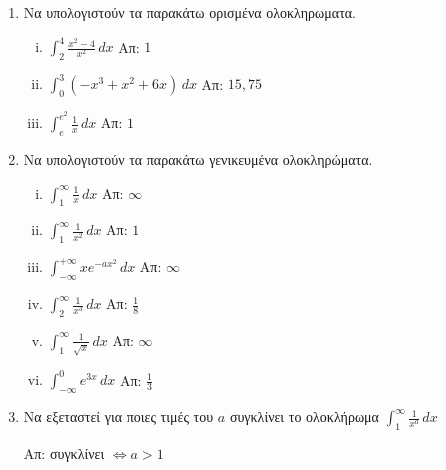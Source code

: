 \begin{enumerate}
    \item Να υπολογιστούν τα παρακάτω ορισμένα ολοκληρωματα.
        \begin{enumerate}[i)]
            \item $ \int _{2}^{4} \frac{x^{2}-4}{x^{2}} \,{dx} $ \hfill Απ: $ 1 $
            \item $ \int _{0}^{3} \left(-x^{3}+x^{2}+6x\right) \,{dx} $ 
                \hfill Απ: $ 15,75 $ 
            \item $ \int _{e}^{e^{2}} \frac{1}{x}  \,{dx} $ \hfill Απ: $ 1 $ 
        \end{enumerate}

\pagebreak

    \item Να υπολογιστούν τα παρακάτω γενικευμένα ολοκληρώματα.

        \begin{enumerate}[i)]
            \item $ \int _{1}^{\infty} \frac{1}{x} \,{dx} $ \hfill Απ: $ \infty $ 
            \item $ \int _{1}^{\infty} \frac{1}{x^{2}} \,{dx}  $ \hfill Απ: $ 1 $
            \item $ \int _{- \infty}^{+\infty} xe^{-ax^{2}} \,{dx} $
                \hfill Απ: $ \infty  $ 
            \item $ \int _{2}^{\infty} \frac{1}{x^{3}} \,{dx} $ 
                \hfill Απ: $ \frac{1}{8} $ 
            \item $ \int _{1}^{\infty}\frac{1}{\sqrt{x}} \,{dx} $ \hfill Απ: $ \infty $ 
            \item $ \int _{-\infty}^{0} e^{3x} \,{dx} $ \hfill Απ: $ \frac{1}{3} $ 
        \end{enumerate}

    \item Να εξεταστεί για ποιες τιμές του $ a $ συγκλίνει το ολοκλήρωμα 
            $ \int _{1}^{\infty} \frac{1}{x^{a}} \,{dx} $ 
            
            \hfill Απ: συγκλίνει $ \Leftrightarrow a > 1 $ 
\end{enumerate}



